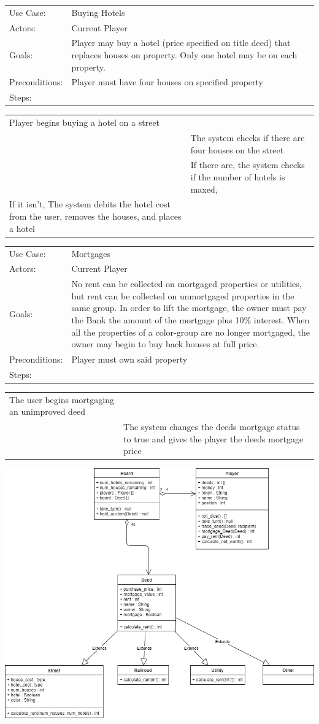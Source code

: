 \documentclass[10pt,letterpaper]{article}
\newcommand{\usecasetwocol}[1]{
\begin{center}
	\begin{tabularx}{0.8\textwidth}{| X X |}
		\hline
		#1 \\
		\hline
	\end{tabularx}
\end{center}
}
\newcommand{\usecasedescription}[1]{
\begin{center}
	\begin{tabularx}{0.8\textwidth}{l X}
		#1
	\end{tabularx}
\end{center}
}
\newcommand{\usecase}[2]{
\usecasedescription{#1}
\usecasetwocol{#2}
}
\begin{document}
\usecase{Use Case: & Buying Hotels \\
	Actors: & Current Player \\
	Goals: & Player may buy a hotel (price specified on title deed) that replaces houses on property. Only one hotel may be on each property. \\
	Preconditions: & Player must have four houses on specified property  \\
	Steps: &  }{Player begins buying a hotel on a street &\\
	&The system checks if there are four houses on the street \\
	&If there are, the system checks if the number of hotels is maxed,  \\
	If it isn’t, The system debits the hotel cost from the user, removes the houses, and places a hotel&}

\usecase{Use Case: & Mortgages \\
	Actors: & Current Player \\
	Goals: &  No rent can be collected on mortgaged properties or utilities, but rent can be collected on unmortgaged properties in the same group. In order to lift the mortgage, the owner must pay the Bank the amount of the mortgage plus 10\% interest. When all the properties of a color-group are no longer mortgaged, the owner may begin to buy back houses at full price.  \\
	Preconditions: & Player must own said property \\
	Steps: & }{The user begins mortgaging an unimproved deed &\\
	&The system changes the deeds mortgage status to true and gives the player the deeds mortgage price}

\includegraphics[width=\textwidth]{class_diagram}
\end{document}
